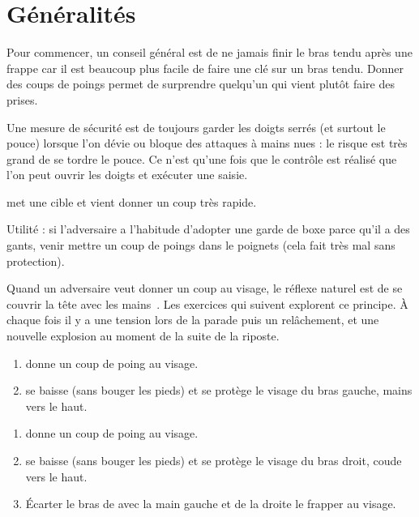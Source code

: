 \section{Généralités}


Pour commencer, un conseil général est de ne jamais finir le bras tendu après une frappe car il est beaucoup plus facile de faire une clé sur un bras tendu.
Donner des coups de poings permet de surprendre quelqu'un qui vient plutôt faire des prises.

Une mesure de sécurité est de toujours garder les doigts serrés (et surtout le pouce) lorsque l'on dévie ou bloque des attaques à mains nues : le risque est très grand de se tordre le pouce.
Ce n'est qu'une fois que le contrôle est réalisé que l'on peut ouvrir les doigts et exécuter une saisie.


\begin{exercice}

	\A met une cible et \D vient donner un coup très rapide.

	Utilité : si l'adversaire a l'habitude d'adopter une garde de boxe parce qu'il a des gants, venir mettre un coup de poings dans le poignets (cela fait très mal sans protection).

\end{exercice}


Quand un adversaire veut donner un coup au visage, le réflexe naturel est de se couvrir la tête avec les mains~\cite{enzi:dijon:messer_inner:2015}.
Les exercices qui suivent explorent ce principe.
À chaque fois il y a une tension lors de la parade puis un relâchement, et une nouvelle explosion au moment de la suite de la riposte.


\begin{exercice}
	\label{mains-nues:ex:enzi-1}

	\begin{enumerate}
		\item \A donne un coup de poing au visage.
		\item \D se baisse (sans bouger les pieds) et se protège le visage du bras gauche, mains vers le haut.
	\end{enumerate}

\end{exercice}


\begin{exercice}
	\label{mains-nues:ex:enzi-2}

	\begin{enumerate}
		\item \A donne un coup de poing au visage.
		\item \D se baisse (sans bouger les pieds) et se protège le visage du bras droit, coude vers le haut.
		\item Écarter le bras de \A avec la main gauche et de la droite le frapper au visage.
	\end{enumerate}

\end{exercice}


